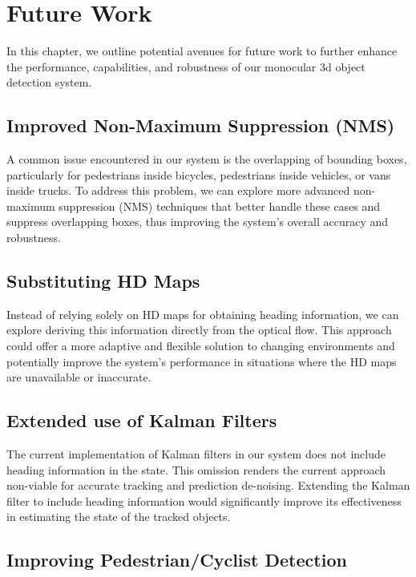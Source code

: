
\chapter{Future Work}
\label{ch:future}

In this chapter, we outline potential avenues for future work to further enhance the performance, capabilities, and robustness of our monocular 3d object detection system.

\section{Improved Non-Maximum Suppression (NMS)}
\label{sec:nms}

A common issue encountered in our system is the overlapping of bounding boxes, particularly for pedestrians inside bicycles,  pedestrians inside vehicles, or vans inside trucks.
To address this problem, we can explore more advanced non-maximum suppression (NMS) techniques that better handle these cases and suppress overlapping boxes, thus improving the system's overall accuracy and robustness.

\section{Substituting HD Maps}
\label{sec:nomap}

Instead of relying solely on HD maps for obtaining heading information, we can explore deriving this information directly from the optical flow.
This approach could offer a more adaptive and flexible solution to changing environments and potentially improve the system's performance in situations where the HD maps are unavailable or inaccurate.

\section{Extended use of Kalman Filters}
\label{sec:extkalman}

The current implementation of Kalman filters in our system does not include heading information in the state.
This omission renders the current approach non-viable for accurate tracking and prediction de-noising.
Extending the Kalman filter to include heading information would significantly improve its effectiveness in estimating the state of the tracked objects.

\section{Improving Pedestrian/Cyclist Detection}
\label{sec:improvepedcyclist}

